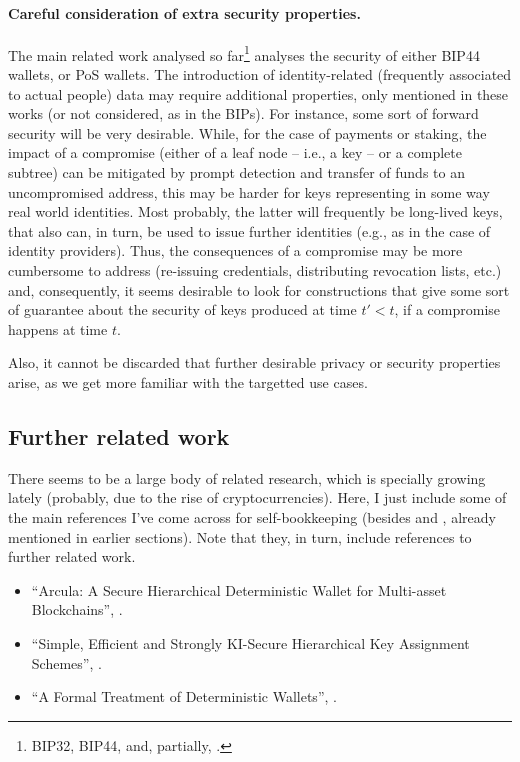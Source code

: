 \paragraph{Careful consideration of extra security properties.} %
The main related work analysed so far\footnote{BIP32, BIP44, \cite{def+21}
  and, partially, \cite{kkl20}.} analyses the security of either BIP44
wallets, or PoS wallets. The introduction of identity-related (frequently
associated to actual people) data may require additional properties, only
mentioned in these works (or not considered, as in the BIPs). For instance,
some sort of forward security will be very desirable. While, for the case of
payments or staking, the impact of a compromise (either of a leaf node --
i.e., a key -- or a complete subtree) can be mitigated by prompt detection
and transfer of funds to an uncompromised address, this may be harder for
keys representing in some way real world identities. Most probably, the
latter will frequently be long-lived keys, that also can, in turn, be used
to issue further identities (e.g., as in the case of identity providers).
Thus, the consequences of a compromise may be more cumbersome to address
(re-issuing credentials, distributing revocation lists, etc.) and,
consequently, it seems desirable to look for constructions that give some
sort of guarantee about the security of keys produced at time $t' < t$, if a
compromise happens at time $t$.

Also, it cannot be discarded that further desirable privacy or security
properties arise, as we get more familiar with the targetted use cases.
  
\subsection{Further related work}

There seems to be a large body of related research, which is specially
growing lately (probably, due to the rise of cryptocurrencies). Here,
I just include some of the main references I've come across for
self-bookkeeping (besides \cite{kkl20} and \cite{def+21}, already
mentioned in earlier sections). Note that they, in turn, include references
to further related work.

\begin{itemize}
\item ``Arcula: A Secure Hierarchical Deterministic Wallet for Multi-asset
  Blockchains'', \cite{lfa20}.
\item ``Simple, Efficient and Strongly KI-Secure Hierarchical Key Assignment
  Schemes'', \cite{fpp13}.
\item ``A Formal Treatment of Deterministic Wallets'', \cite{dfl19}.
\end{itemize}

